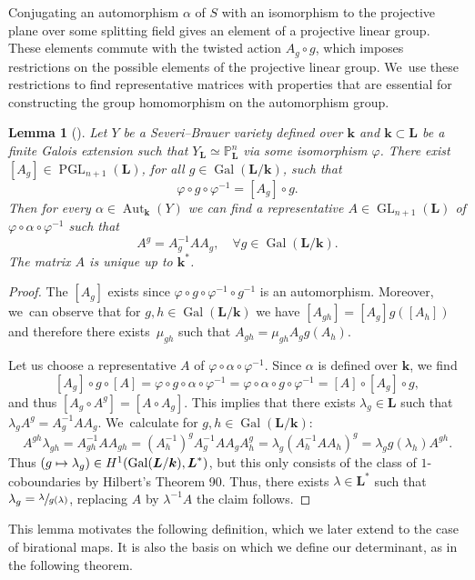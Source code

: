 \documentclass[JEP,XML,SOM,Unicode,NoFloatCountersInSection, NoEqCountersInSection,published]{cedram}
\newcommand\mto{\mathchoice{\longmapsto}{\mapsto}{\mapsto}{\mapsto}}
\DeclareMathOperator{\Gal}{Gal}
\newtheorem{lemma}[theorem]{Lemma}
\theoremstyle{definition}
\newcommand{\kk}{{\boldsymbol{k}}}
\newcommand{\LL}{{\boldsymbol{L}}}
\DeclareMathOperator{\PGL}{PGL}
\DeclareMathOperator{\GL}{GL}
\DeclareMathOperator{\Aut}{Aut}
\begin{document}
Conjugating an automorphism $\alpha$ of $S$ with an isomorphism to the projective plane over some splitting field gives an element of a projective linear group. These elements commute with the twisted action $A_g \circ g$, which imposes restrictions on the possible elements of the projective linear group. We~use these restrictions to find representative matrices with properties that are essential for constructing the group homomorphism on the automorphism group.

\begin{lemma}[\cite{BSYUnp}] \label{AutRep}
Let $Y$ be a Severi--Brauer variety defined over $\kk$ and $\kk \subset \LL$ be a finite Galois extension such that $Y_{\LL} \simeq \mathbb{P}^n_{\LL}$ via some isomorphism $\varphi$. There exist $[A_g] \in \PGL_{n + 1}(\LL)$, for all $ g \in \Gal(\LL/\kk)$, such that
\[
\varphi \circ g \circ \varphi^{-1} = [A_g] \circ g.
\]
Then for every $\alpha \in \Aut_{\kk}(Y)$ we can find a representative $A \in \GL_{n + 1}(\LL)$ of $\varphi \circ \alpha \circ \varphi^{-1}$ such that
\begin{equation} \label{eq:Rep}
A^g = A_g^{-1}AA_g,\quad \forall g \in \Gal(\LL/\kk).
\end{equation}
The matrix $A$ is unique up to $\kk^*$.
\end{lemma}

\begin{proof}
The $[A_g]$ exists since $\varphi \circ g \circ \varphi^{-1} \circ g^{-1}$ is an automorphism. Moreover, we~can observe that for $g,h \in \Gal(\LL/\kk)$ we have $[A_{gh}] = [A_g]g([A_h])$ and therefore there exists~$\mu_{gh}$ such that $A_{gh} = \mu_{gh}A_g g(A_h)$.

Let us choose a representative $A$ of $\varphi \circ \alpha \circ \varphi^{-1}$. Since $\alpha$ is defined over $\kk$, we find
\[
[A_g] \circ g \circ [A] = \varphi \circ g \circ \alpha \circ \varphi^{-1} = \varphi \circ \alpha \circ g \circ \varphi^{-1} = [A] \circ [A_g] \circ g,
\]
and thus $[A_g \circ A^g] = [A \circ A_g]$. This implies that there exists $\lambda_g \in \LL$ such that $\lambda_g A^g = A_g^{-1} A A_g$. We~calculate for $g,h \in \Gal(\LL/ \kk)$:
\[
A^{gh} \lambda_{gh} = A_{gh}^{-1} A A_{gh} = (A_h^{-1})^g A_g^{-1} A A_g A_h^g = \lambda_g (A_h^{-1} A A_h)^g = \lambda_g g(\lambda_h) A^{gh}.
\]
Thus $(g \mto \lambda_g) \in H^1(\Gal(\LL/\kk),\LL^*)$, but this only consists of the class of $1$\nobreakdash-cobound\-aries by Hilbert's Theorem 90. Thus, there exists $\lambda \in \LL^*$ such that $\lambda_g = \sfrac{\lambda}{g(\lambda)}$, replacing $A$ by $\lambda^{-1} A$ the claim follows.
\end{proof}
This lemma motivates the following definition, which we later extend to the case of birational maps. It is also the basis on which we define our determinant, as in the following theorem.
\end{document}
